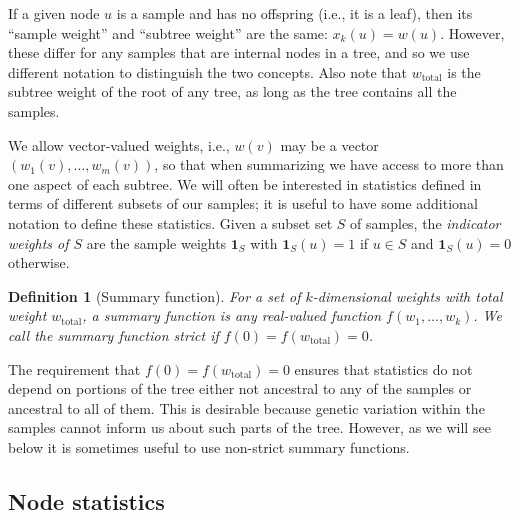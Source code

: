 \documentclass[9pt,twoside,lineno]{gsajnl}
\newcommand{\bone}{\mathbf{1}}
\newtheorem{definition}{Definition}
\newcommand{\iw}{w} %
\newcommand{\tiw}{w_\text{total}} %
\newcommand{\nw}{x} %
\begin{document}
If a given node $u$ is a sample and has no offspring (i.e., it is a leaf),
then its ``sample weight'' and ``subtree weight'' are the same: $\nw_k(u) = \iw(u)$.
However,
these differ for any samples that are internal nodes in a tree,
and so we use different notation to distinguish the two concepts.
Also note that $\tiw$ is the subtree weight of the root of any tree,
as long as the tree contains all the samples.

We allow vector-valued weights,
i.e., $\iw(v)$ may be a vector $(\iw_1(v), \ldots, \iw_m(v))$,
so that when summarizing we have access to more than one aspect of each subtree.
We will often be interested in statistics defined in terms of different subsets of our samples;
it is useful to have some additional notation to define these statistics.
Given a subset set $S$ of samples,
the \emph{indicator weights of $S$} are the sample weights $\bone_S$ with
$\bone_S(u) = 1$ if $u \in S$ and $\bone_S(u) = 0$ otherwise.

\begin{definition}[Summary function]
    For a set of $k$-dimensional weights with total weight $\tiw$,
    a summary function is any real-valued function $f(w_1, \ldots, w_k)$.
    We call the summary function \emph{strict} if $f(0) = f(\tiw) = 0$.
\end{definition}

The requirement that $f(0) = f(\tiw) = 0$ ensures
that statistics do not depend on portions of the tree either not ancestral to any of the samples
or ancestral to all of them.
This is desirable because genetic variation within the samples
cannot inform us about such parts of the tree.
However, as we will see below it is sometimes useful to use non-strict summary functions.



\subsection*{Node statistics}
\end{document}
